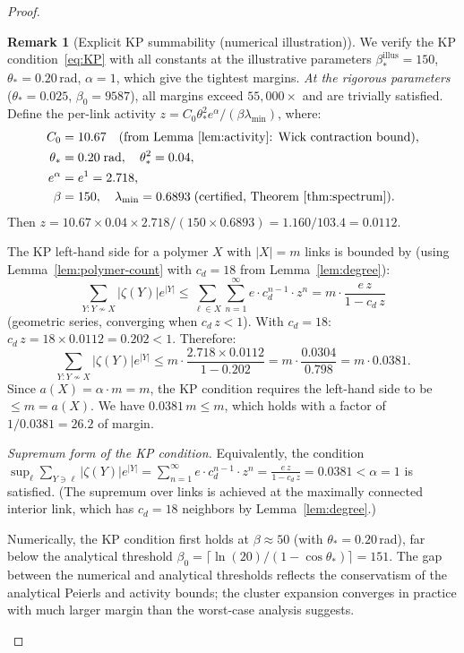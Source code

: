 \documentclass[11pt]{article}
\theoremstyle{definition}
\newtheorem{remark}[theorem]{Remark}
\begin{document}
\begin{proof}
\begin{remark}[Explicit KP summability (numerical illustration)]%
\label{rem:KP-explicit}
We verify the KP condition~\eqref{eq:KP} with all constants
at the illustrative parameters
$\beta_*^{\mathrm{illus}}=150$, $\theta_*=0.20$\,rad, $\alpha=1$,
which give the tightest margins.
\emph{At the rigorous parameters} ($\theta_*=0.025$,
$\beta_0=9587$), all margins exceed $55{,}000\times$ and
are trivially satisfied.
Define the per-link activity
$z=C_0\theta_*^2 e^\alpha/(\beta\lambda_{\min})$, where:
\begin{align*}
C_0&=10.67\quad\text{(from Lemma~\ref{lem:activity}: Wick
contraction bound)},\\
\theta_*&=0.20\;\text{rad},\quad\theta_*^2=0.04,\\
e^\alpha&=e^1=2.718,\\
\beta&=150,\quad\lambda_{\min}=0.6893\;\text{(certified,
Theorem~\ref{thm:spectrum})}.
\end{align*}
Then $z=10.67\times 0.04\times 2.718/(150\times 0.6893)
=1.160/103.4=0.0112$.

The KP left-hand side for a polymer $X$ with $|X|=m$ links
is bounded by (using Lemma~\ref{lem:polymer-count} with
$c_d=18$ from Lemma~\ref{lem:degree}):
\begin{equation}\label{eq:KP-explicit}
\sum_{Y:Y\not\sim X}|\zeta(Y)|e^{|Y|}
\le\sum_{\ell\in X}\sum_{n=1}^\infty e\cdot c_d^{n-1}\cdot z^n
=m\cdot\frac{e\,z}{1-c_d\,z}
\end{equation}
(geometric series, converging when $c_d\,z<1$).
With $c_d=18$: $c_d\,z=18\times 0.0112=0.202<1$.
Therefore:
\[
\sum_{Y:Y\not\sim X}|\zeta(Y)|e^{|Y|}
\le m\cdot\frac{2.718\times 0.0112}{1-0.202}
=m\cdot\frac{0.0304}{0.798}
=m\cdot 0.0381.
\]
Since $a(X)=\alpha\cdot m=m$, the KP condition requires the
left-hand side to be $\le m=a(X)$.  We have $0.0381\,m\le m$,
which holds with a factor of $1/0.0381=26.2$ of margin.

\emph{Supremum form of the KP condition.}
Equivalently, the condition
$\sup_\ell\sum_{Y\ni\ell}|\zeta(Y)|e^{|Y|}
=\sum_{n=1}^\infty e\cdot c_d^{n-1}\cdot z^n
=\frac{e\,z}{1-c_d\,z}=0.0381<\alpha=1$
is satisfied.  (The supremum over links is achieved at
the maximally connected interior link, which has
$c_d=18$ neighbors by Lemma~\ref{lem:degree}.)

Numerically, the KP condition first holds at $\beta\approx 50$
(with $\theta_*=0.20$\,rad), far below the analytical threshold
$\beta_0=\lceil\ln(20)/(1-\cos\theta_*)\rceil=151$.
The gap between the numerical and analytical thresholds reflects
the conservatism of the analytical Peierls and activity bounds;
the cluster expansion converges in practice with much larger
margin than the worst-case analysis suggests.
\end{remark}


\end{proof}
\end{document}
